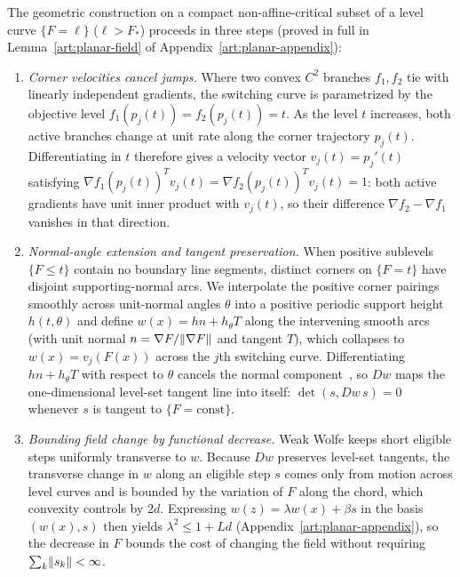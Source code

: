The geometric construction on a compact non-affine-critical subset of a level
curve $\{F=\ell\}$ ($\ell>F_*$) proceeds in three steps (proved in full in
Lemma~\ref{art:planar-field} of Appendix~\ref{art:planar-appendix}):
\begin{enumerate}
\item \emph{Corner velocities cancel jumps.} Where two convex $C^2$ branches
$f_1,f_2$ tie with linearly independent gradients, the switching curve is
parametrized by the objective level $f_1(p_j(t))=f_2(p_j(t))=t$. As the level
$t$ increases, both active branches change at unit rate along the corner
trajectory $p_j(t)$. Differentiating in $t$ therefore gives a velocity vector
$v_j(t)=p_j'(t)$ satisfying $\nabla f_1(p_j(t))^Tv_j(t)=\nabla f_2(p_j(t))^Tv_j(t)=1$:
both active gradients have unit inner product with $v_j(t)$, so their difference
$\nabla f_2-\nabla f_1$ vanishes in that direction.
\item \emph{Normal-angle extension and tangent preservation.} When positive
sublevels $\{F\le t\}$ contain no boundary line segments, distinct corners on
$\{F=t\}$ have disjoint supporting-normal arcs. We interpolate the positive
corner pairings smoothly across unit-normal angles $\theta$ into a positive
periodic support height $h(t,\theta)$ and define $w(x)=hn+h_\theta T$ along the
intervening smooth arcs (with unit normal $n=\nabla F/\lVert\nabla F\rVert$ and
tangent $T$), which collapses to $w(x)=v_j(F(x))$ across the $j$th switching
curve. Differentiating $hn+h_\theta T$ with respect to $\theta$ cancels the
normal component~\cite{geom_Bogosel2023}, so $Dw$ maps the one-dimensional
level-set tangent line into itself: $\det(s,Dw\,s)=0$ whenever $s$ is tangent to
$\{F=\text{const}\}$.
\item \emph{Bounding field change by functional decrease.} Weak Wolfe keeps
short eligible steps uniformly transverse to $w$. Because $Dw$ preserves
level-set tangents, the transverse change in $w$ along an eligible step $s$
comes only from motion across level curves and is bounded by the variation of
$F$ along the chord, which convexity controls by $2d$. Expressing
$w(z)=\lambda w(x)+\beta s$ in the basis $(w(x),s)$ then yields
$\lambda^2\le1+Ld$ (Appendix~\ref{art:planar-appendix}), so the decrease in $F$
bounds the cost of changing the field without requiring $\sum_k\lVert s_k\rVert<\infty$.
\end{enumerate}

